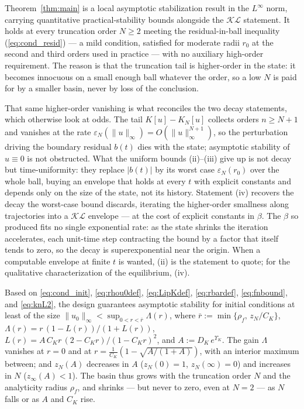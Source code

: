 \documentclass[10pt,a4paper]{amsart}
\newcommand{\Linf}{L^\infty}
\newcommand{\eps}{\varepsilon}
\begin{document}
Theorem~\ref{thm:main} is a local asymptotic stabilization result in the $\Linf$ norm, carrying quantitative practical-stability bounds alongside the $\mathcal{KL}$ statement. It holds at every truncation order $N \ge 2$ meeting the residual-in-ball inequality (\ref{eq:cond_resid}) --- a mild condition, satisfied for moderate radii $r_0$ at the second and third orders used in practice --- with no auxiliary high-order requirement. The reason is that the truncation tail is higher-order in the state: it becomes innocuous on a small enough ball whatever the order, so a low $N$ is paid for by a smaller basin, never by loss of the conclusion.

That same higher-order vanishing is what reconciles the two decay statements, which otherwise look at odds. The tail $K[u] - K_N[u]$ collects orders $n \ge N+1$ and vanishes at the rate $\eps_N(\|u\|_\infty) = O(\|u\|_\infty^{N+1})$, so the perturbation driving the boundary residual $b(t)$ dies with the state; asymptotic stability of $u \equiv 0$ is not obstructed. What the uniform bounds (ii)--(iii) give up is not decay but time-uniformity: they replace $|b(t)|$ by its worst case $\eps_N(r_0)$ over the whole ball, buying an envelope that holds at every $t$ with explicit constants and depends only on the size of the state, not its history. Statement (iv) recovers the decay the worst-case bound discards, iterating the higher-order smallness along trajectories into a $\mathcal{KL}$ envelope --- at the cost of explicit constants in $\beta$. The $\beta$ so produced fits no single exponential rate: as the state shrinks the iteration accelerates, each unit-time step contracting the bound by a factor that itself tends to zero, so the decay is superexponential near the origin. When a computable envelope at finite $t$ is wanted, (ii) is the statement to quote; for the qualitative characterization of the equilibrium, (iv).

Based on \eqref{eq:cond_init}, \eqref{eq:rhou0def}, \eqref{eq:LipKdef}, \eqref{eq:rbardef}, \eqref{eq:fnbound}, and \eqref{eq:knL2}, the design guarantees asymptotic stability for initial conditions at least of the size $\|u_0\|_\infty < \sup_{0 < r < \bar r} \Lambda(r)$, where $\bar r := \min\{\rho_f,\, z_N/C_K\}$, $\Lambda(r) = r\,(1 - L(r))/(1 + L(r))$, $L(r) = A\,C_K r\,(2 - C_K r)/(1 - C_K r)^2$, and $A := D_K\, e^{\Upsilon_K}$. The gain $\Lambda$ vanishes at $r = 0$ and at $r = \tfrac{1}{C_K}(1 - \sqrt{A/(1+A)})$, with an interior maximum between; and $z_N(A)$ decreases in $A$ ($z_N(0) = 1$, $z_N(\infty) = 0$) and increases in $N$ ($z_\infty(A) < 1$). The basin thus grows with the truncation order $N$ and the analyticity radius $\rho_f$, and shrinks --- but never to zero, even at $N = 2$ --- as $N$ falls or as $A$ and $C_K$ rise.
\end{document}
